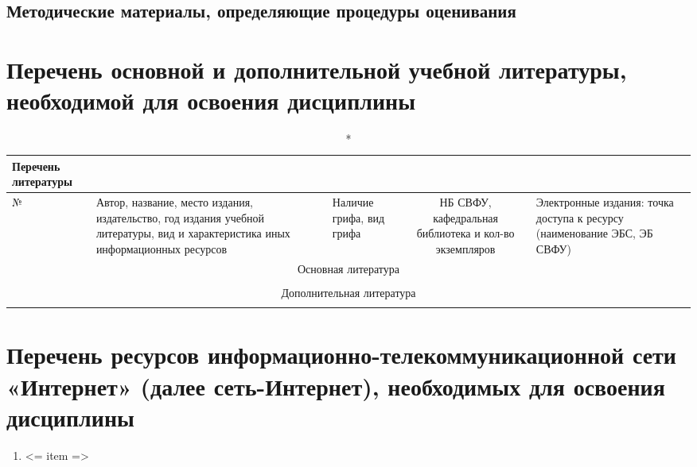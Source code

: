 \documentclass[a4paper,12pt]{article}
\begin{document}
\subsection{Методические материалы, определяющие процедуры оценивания}



\newpage
\section{Перечень основной и дополнительной учебной литературы, необходимой для освоения дисциплины}

  \begin{longtable}{|l|p{7cm}|p{18mm}|c|p{32mm}|}
  \caption*{Перечень литературы}\\
  \hline
  № & 
  \centering\small\arraybackslash Автор, название, место издания, издательство, год издания учебной литературы, вид и характеристика иных информационных ресурсов &
  \multicolumn{1}{p{18mm}|}{\centering\small\arraybackslash Наличие грифа, вид грифа} &
  \multicolumn{1}{p{21mm}|}{\centering\small\arraybackslash НБ СВФУ, кафедральная библиотека и кол-во экземпляров} & 
  \centering\small\arraybackslash Электронные издания: точка доступа к ресурсу (наименование ЭБС, ЭБ СВФУ)\\
  \hline
  \multicolumn{5}{|c|}{Основная литература}\\
  \hline
  \\
  \hline
  \multicolumn{5}{|c|}{Дополнительная литература}\\
  \hline
  \\
  \hline
  \end{longtable}
  
\section{Перечень ресурсов информационно-телекоммуникационной сети «Интернет» (далее сеть-Интернет), необходимых для освоения дисциплины}
\begin{enumerate}
  \item <= item => 
\end{enumerate}
\end{document}
